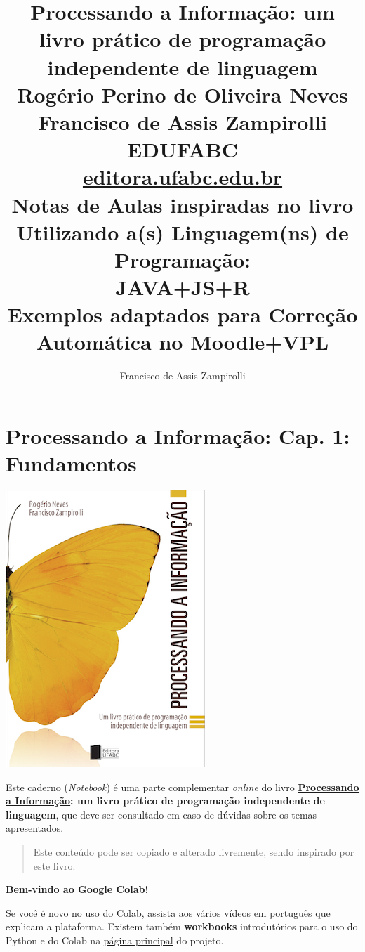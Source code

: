 \documentclass[12pt,a4paper]{article}
\title{Processando a Informação: um livro prático de programação independente de linguagem 
\\\large\vspace{2cm}
Rogério Perino de Oliveira Neves 
\\\vspace{5mm}
Francisco de Assis Zampirolli
\\\large\vspace{2cm}
EDUFABC
\\ \url{editora.ufabc.edu.br}
\\\Huge\vspace{3cm}
Notas de Aulas inspiradas no livro
\\\Large\vspace{1cm}
Utilizando a(s) Linguagem(ns) de Programação: 
\\\Huge\vspace{1cm}
JAVA+JS+R
\\\large\vspace{1cm}
Exemplos adaptados para Correção Automática no Moodle+VPL
\vspace{2cm}}
\author{Francisco de Assis Zampirolli\vspace{1cm}}
\begin{document}
    
    
\clearpage\maketitle
\thispagestyle{empty}
\tableofcontents

    
    

    
    \hypertarget{processando-a-informauxe7uxe3o-cap.-1-fundamentos}{%
\section{Processando a Informação: Cap. 1:
Fundamentos}\label{processando-a-informauxe7uxe3o-cap.-1-fundamentos}}

    \includegraphics{"figs/Capa_Processando_Informacao.jpg"}

Este caderno (\emph{Notebook}) é uma parte complementar \emph{online} do
livro
\textbf{\href{https://editora.ufabc.edu.br/matematica-e-ciencias-da-computacao/58-processando-a-informacao}{Processando
a Informação}: um livro prático de programação independente de
linguagem}, que deve ser consultado em caso de dúvidas sobre os temas
apresentados.

\begin{quote}
Este conteúdo pode ser copiado e alterado livremente, sendo inspirado
por este livro.
\end{quote}

    \textbf{Bem-vindo ao Google Colab!}

Se você é novo no uso do Colab, assista aos vários
\href{https://www.youtube.com/results?search_query=introdu\%C3\%A7\%C3\%A3o+ao+colab}{vídeos
em português} que explicam a plataforma. Existem também
\textbf{workbooks} introdutórios para o uso do Python e do Colab na
\href{https://colab.research.google.com/}{página principal} do projeto.
\end{document}
